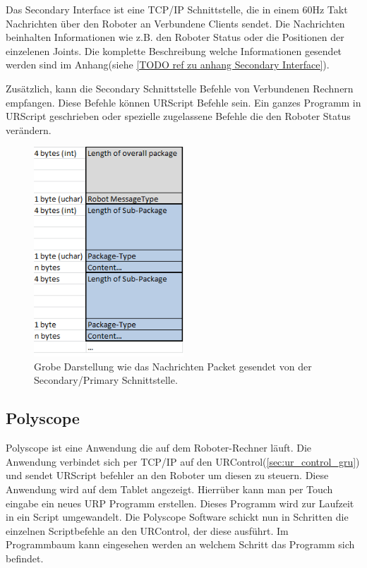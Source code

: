 Das Secondary Interface ist eine \acs{TCP/IP} Schnittstelle, die in einem 60Hz Takt Nachrichten über den Roboter an Verbundene Clients sendet.
Die Nachrichten beinhalten Informationen wie z.B. den Roboter Status oder die Positionen der einzelenen Joints.
Die komplette Beschreibung welche Informationen gesendet werden sind im Anhang(siehe \ref{TODO ref zu anhang Secondary Interface}).

Zusätzlich, kann die Secondary Schnittstelle Befehle von Verbundenen Rechnern empfangen. 
Diese Befehle können URScript Befehle sein. Ein ganzes Programm in URScript geschrieben oder spezielle zugelassene Befehle die den Roboter Status verändern.

\begin{figure}[H]
  \centering
    \includegraphics[width=0.5\textwidth]{pic/secondary_datapackage_scheme.png}
      \caption[Schema des Datenpackets gesendet von der Secondary Schnittstelle]{Grobe Darstellung wie das Nachrichten Packet gesendet von der Secondary/Primary Schnittstelle.}
      \label{fig:datascheme_of_secondary_interface}
\end{figure}

\subsection{Polyscope}
\label{urcontrol_polyscope_gru}

Polyscope ist eine Anwendung die auf dem Roboter-Rechner läuft. Die Anwendung verbindet sich per \acs{TCP/IP} auf den URControl(\ref{sec:ur_control_gru}) und sendet URScript befehler an den Roboter um diesen zu steuern.
Diese Anwendung wird auf dem Tablet angezeigt. Hierrüber kann man per Touch eingabe ein neues \acs{URP} Programm erstellen. Dieses Programm wird zur Laufzeit in ein Script umgewandelt. Die Polyscope Software schickt nun in Schritten die einzelnen Scriptbefehle an den URControl, der diese ausführt. Im Programmbaum kann eingesehen werden an welchem Schritt das Programm sich befindet.

